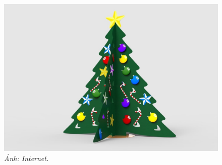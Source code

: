 \begin{multicols}{2}
\begin{figure}[H]
		\includegraphics[height= 0.31\linewidth]{9c}
		\caption{\small\textit{\color{toancuabi}Ảnh: Internet.}}
		\vspace*{-10pt}
	\end{figure}
\end{multicols}
%
